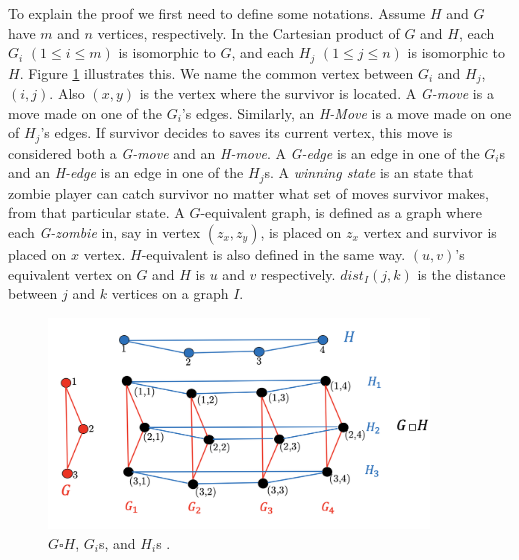 \documentclass[1p]{elsarticle}
\begin{document}
To explain the proof we first need to define some notations. Assume $H$ and $G$ have $m$ and $n$ vertices, respectively.
In the Cartesian product of $G$ and $H$, each $G_{i}$  $(1 \leq i \leq m)$ is isomorphic to $G$, and each $H_{j}$ $(1
\leq j \leq n)$ is isomorphic to $H$. Figure \ref{fig:p1} illustrates this. We name the common vertex between $G_{i}$
and $H_{j}$, $(i,j)$. Also $(x,y)$ is the vertex where the survivor is located. A {\it G-move} is a move made on one of
the $G_{i}$'s edges.  Similarly, an {\it H-Move} is a move made on one of $H_{j}$'s edges. If survivor decides to saves
its current vertex, this move is considered both a {\it G-move} and an {\it H-move}. A {\it G-edge} is an edge in one of
the $G_{i}$s and an {\it H-edge} is an edge in one of the $H_{j}$s. A {\it winning state} is an state that zombie player
can catch survivor no matter what set of moves survivor makes, from that particular state. A $G$-equivalent graph, is
defined as a graph where each {\it G-zombie} in, say in vertex $(z_x,z_y)$, is placed on $z_x$ vertex and survivor is placed on
$x$ vertex. $H$-equivalent is also defined in the same way. $(u,v)$'s equivalent vertex on $G$ and $H$ is $u$ and $v$ respectively.
$dist_I(j,k)$ is the distance between $j$ and $k$ vertices on a graph $I$.
\begin{figure}[h!]
	
	\centering
	\includegraphics[width=0.9\textwidth]{fig/cp3.png}
	\caption{$G \square H$, $G_i$s, and $H_i$s .}
	\label{fig:p1}
\end{figure}
\end{document}
